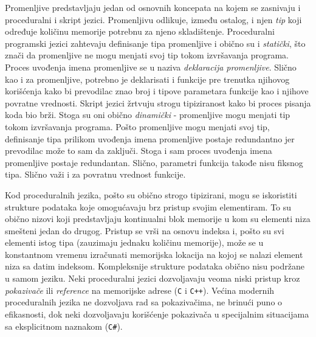 Promenljive predstavljaju jedan od osnovnih koncepata na kojem se zasnivaju i proceduralni i skript jezici. Promenljivu odlikuje, između ostalog, i njen \emph{tip} koji određuje količinu memorije potrebnu za njeno skladištenje. Proceduralni programski jezici zahtevaju definisanje tipa promenljive i obično su i \emph{statički}, što znači da promenljive ne mogu menjati svoj tip tokom izvršavanja programa. Proces uvođenja imena promenljive se u naziva \emph{deklaracija promenljive}. Slično kao i za promenljive, potrebno je deklarisati i funkcije pre trenutka njihovog korišćenja kako bi prevodilac znao broj i tipove parametara funkcije kao i njihove povratne vrednosti. Skript jezici žrtvuju strogu tipiziranost kako bi proces pisanja koda bio brži. Stoga su oni obično \emph{dinamički} - promenljive mogu menjati tip tokom izvršavanja programa. Pošto promenljive mogu menjati svoj tip, definisanje tipa prilikom uvođenja imena promenljive postaje redundantno jer prevodilac može to sam da zaključi. Stoga i sam proces uvođenja imena promenljive postaje redundantan. Slično, parametri funkcija takođe nisu fiksnog tipa. Slično važi i za povratnu vrednost funkcije.

Kod proceduralnih jezika, pošto su obično strogo tipizirani, mogu se iskoristiti strukture podataka koje omogućavaju brz pristup svojim elementiram. To su obično nizovi koji predstavljaju kontinualni blok memorije u kom su elementi niza smešteni jedan do drugog. Pristup se vrši na osnovu indeksa i, pošto su svi elementi istog tipa (zauzimaju jednaku količinu memorije), može se u konstantnom vremenu izračunati memorijska lokacija na kojoj se nalazi element niza sa datim indeksom. Kompleksnije strukture podataka obično nisu podržane u samom jeziku. Neki proceduralni jezici dozvoljavaju veoma niski pristup kroz \emph{pokazivače} ili \emph{reference} na memorijske adrese (\texttt{C} i \texttt{C++}). Većina modernih proceduralnih jezika ne dozvoljava rad sa pokazivačima, ne brinući puno o efikasnosti, dok neki dozvoljavaju korišćenje pokazivača u specijalnim situacijama sa eksplicitnom naznakom (\texttt{C\#}).

